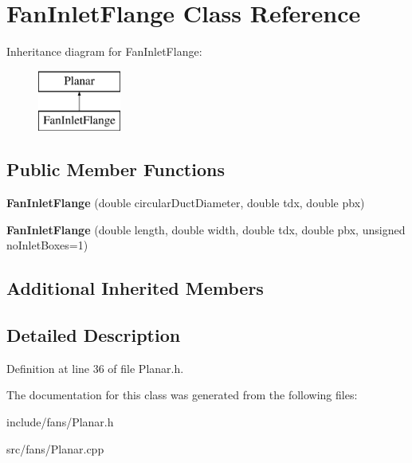 \hypertarget{class_fan_inlet_flange}{}\section{Fan\+Inlet\+Flange Class Reference}
\label{class_fan_inlet_flange}
Inheritance diagram for Fan\+Inlet\+Flange\+:\begin{figure}[H]
\begin{center}
\leavevmode
\includegraphics[height=2.000000cm]{d3/dca/class_fan_inlet_flange}
\end{center}
\end{figure}
\subsection*{Public Member Functions}
\begin{DoxyCompactItemize}
\item 
\mbox{\label{class_fan_inlet_flange_a56cdb0d5f1095a700a5aca9a3e938d54}} 
{\bfseries Fan\+Inlet\+Flange} (double circular\+Duct\+Diameter, double tdx, double pbx)
\item 
\mbox{\label{class_fan_inlet_flange_adc05bbcc8662f73dca44f0824df9be9f}} 
{\bfseries Fan\+Inlet\+Flange} (double length, double width, double tdx, double pbx, unsigned no\+Inlet\+Boxes=1)
\end{DoxyCompactItemize}
\subsection*{Additional Inherited Members}


\subsection{Detailed Description}


Definition at line 36 of file Planar.\+h.



The documentation for this class was generated from the following files\+:\begin{DoxyCompactItemize}
\item 
include/fans/Planar.\+h\item 
src/fans/Planar.\+cpp\end{DoxyCompactItemize}
